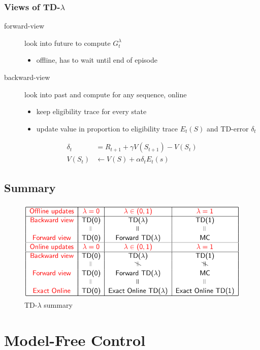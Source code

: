 \documentclass[]{article}
\theoremstyle{definition}
\begin{document}
\subsubsection{Views of TD-$\lambda$}%
\label{ssub:views_of_td_lambda}

\begin{description}
    \item[forward-view] look into future to compute $G_t^\lambda$
        \begin{itemize}
            \item offline, has to wait until end of episode
        \end{itemize}
    \item[backward-view] look into past and compute for any sequence, online
        \begin{itemize}
            \item keep eligibility trace for every state
            \item update value in proportion to eligibility trace $E_t(S)$ and TD-error $\delta_t$
        \end{itemize}
\end{description}
\begin{align*}
    \delta_t &= R_{t+1} + \gamma V(S_{t+1}) - V(S_t) \\
    V(S_t) &\gets V(S) + \alpha \delta_t E_t(s)
\end{align*}

\subsection{Summary}%
\label{sub:td_summary}

\begin{figure}[ht]
    \centering
    \includegraphics[width=0.5\linewidth]{td-lambda-summary.png}
    \caption{TD-$\lambda$ summary}
    \label{fig:td-lambda-summary}
\end{figure}

\section{Model-Free Control}%
\label{sec:model_free_control}
\end{document}
